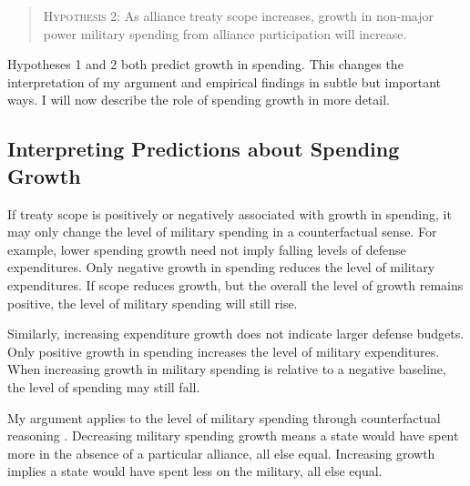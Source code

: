 \documentclass[12pt]{article}
\begin{document}
\begin{quote}
\textsc{Hypothesis 2}: As alliance treaty scope increases, growth in non-major power military spending from alliance participation will increase. 
\end{quote}


Hypotheses 1 and 2 both predict growth in spending. 
This changes the interpretation of my argument and empirical findings in subtle but important ways. 
I will now describe the role of spending growth in more detail. 


\subsection{Interpreting Predictions about Spending Growth}


If treaty scope is positively or negatively associated with growth in spending, it may only change the level of military spending in a counterfactual sense. 
For example, lower spending growth need not imply falling levels of defense expenditures. 
Only negative growth in spending reduces the level of military expenditures. 
If scope reduces growth, but the overall the level of growth remains positive, the level of military spending will still rise. 


Similarly, increasing expenditure growth does not indicate larger defense budgets. 
Only positive growth in spending increases the level of military expenditures. 
When increasing growth in military spending is relative to a negative baseline, the level of spending may still fall. 


My argument applies to the level of military spending through counterfactual reasoning \citep{Fearon1991}. 
Decreasing military spending growth means a state would have spent more in the absence of a particular alliance, all else equal. 
Increasing growth implies a state would have spent less on the military, all else equal.
\end{document}
